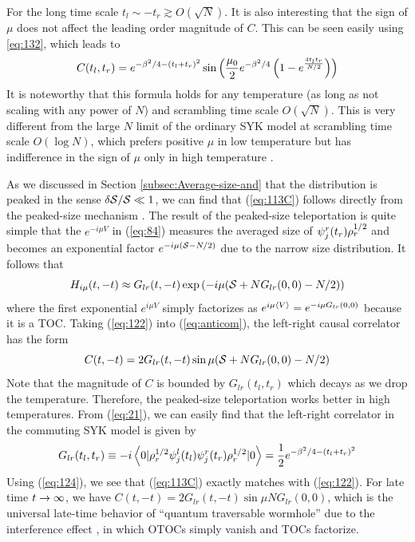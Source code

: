 \documentclass[11pt]{article}
\renewcommand{\>}{\rangle}
\newcommand{\<}{\langle}
\begin{document}
For the long time scale $t_{l}\sim-t_{r}\gtrsim O(\sqrt{N})$. It
is also interesting that the sign of $\mu$ does not affect the leading
order magnitude of $C$. This can be seen easily using \eqref{eq:132}, which leads to
\begin{equation}
C(t_{l},t_{r})=e^{-\beta^{2}/4-(t_{l}+t_{r})^{2}}\sin\left(\frac{\mu_{0}}{2}e^{-\beta^{2}/4}\left(1-e^{\frac{4t_{l}t_{r}}{N/2}}\right)\right)\label{eq:113C}
\end{equation}
It is noteworthy that this formula holds for any temperature (as long
as not scaling with any power of $N$) and scrambling time scale $O(\sqrt{N})$.
This is very different from the large $N$ limit of the ordinary SYK model
at scrambling time scale $O(\log N)$, which prefers positive $\mu$
in low temperature but has indifference in the sign of $\mu$ only
in high temperature \cite{Gao:2019nyj}. 

As we discussed in Section \ref{subsec:Average-size-and} that the
distribution is peaked in the sense $\delta\mathcal{S}/\mathcal{S}\ll 1$, we can find that (\ref{eq:113C})
follows directly from the peaked-size mechanism \cite{Schuster:2021uvg}. The result
of the peaked-size teleportation is quite simple that the $e^{-i\mu V}$
in (\ref{eq:84}) measures the averaged size of $\psi_{j}^{r}(t_{r})\rho_{r}^{1/2}$
and becomes an exponential factor $e^{-i\mu(\mathcal{S}-N/2)}$ due to the
narrow size distribution. It follows that
\begin{equation}
H_{i\mu}(t,-t)\approx G_{lr}(t,-t)\exp\left(-i\mu(\mathcal{S}+NG_{lr}(0,0)-N/2)\right)\label{eq:122}
\end{equation}
where the first exponential $e^{i\mu V}$ simply factorizes as $e^{i\mu\left\langle V\right\rangle}=e^{-i\mu G_{lr}(0,0)}$
because it is a TOC. Taking (\ref{eq:122}) into (\ref{eq:anticom}),
the left-right causal correlator has the form
\begin{equation}
C(t,-t)=2G_{lr}(t,-t)\sin\mu(\mathcal{S}+NG_{lr}(0,0)-N/2)\label{eq:123}
\end{equation}
Note that the magnitude of $C$ is bounded by $G_{lr}(t_{l},t_{r})$
which decays as we drop the temperature. Therefore, the peaked-size
teleportation works better in high temperatures. From (\ref{eq:21}),
we can easily find that the left-right correlator in the commuting
SYK model is given by 
\begin{equation}
G_{lr}(t_{l},t_{r})\equiv-i\left\langle 0|\rho_{r}^{1/2}\psi_{j}^{l}(t_{l})\psi_{j}^{r}(t_{r})\rho_{r}^{1/2}|0\right\rangle=\frac{1}{2}e^{-\beta^{2}/4-(t_{l}+t_{r})^{2}}\label{eq:124}
\end{equation}
Using (\ref{eq:124}), we see that (\ref{eq:113C}) exactly matches
with (\ref{eq:122}). For late time $t\rightarrow\infty$, we have $C(t,-t)=2G_{lr}(t,-t)\sin\mu NG_{lr}(0,0)$,
which is the universal late-time behavior of ``quantum traversable
wormhole'' due to the interference effect \cite{Gao:2018yzk}, in which OTOCs
simply vanish and TOCs factorize.
\end{document}
